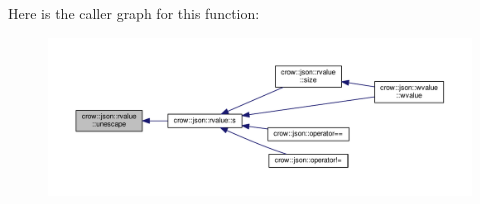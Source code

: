 Here is the caller graph for this function\-:
\nopagebreak
\begin{figure}[H]
\begin{center}
\leavevmode
\includegraphics[width=350pt]{classcrow_1_1json_1_1rvalue_a4547a0694408bfc57d8a05d6a3664b54_icgraph}
\end{center}
\end{figure}




